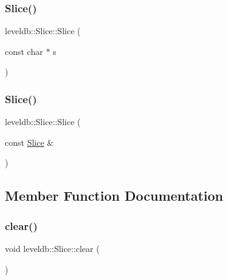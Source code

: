 \mbox{\label{classleveldb_1_1_slice_a429c530560405fe1a7cd745f7afecf5a}} 
\subsubsection{\texorpdfstring{Slice()}{Slice()}\hspace{0.1cm}{\footnotesize\ttfamily [4/5]}}
{\footnotesize\ttfamily leveldb\+::\+Slice\+::\+Slice (\begin{DoxyParamCaption}\item[{const char $\ast$}]{s }\end{DoxyParamCaption})\hspace{0.3cm}{\ttfamily [inline]}}

\mbox{\label{classleveldb_1_1_slice_a53cdde237c653292d361e92bc0f25229}} 
\subsubsection{\texorpdfstring{Slice()}{Slice()}\hspace{0.1cm}{\footnotesize\ttfamily [5/5]}}
{\footnotesize\ttfamily leveldb\+::\+Slice\+::\+Slice (\begin{DoxyParamCaption}\item[{const \mbox{\hyperlink{classleveldb_1_1_slice}{Slice}} \&}]{ }\end{DoxyParamCaption})\hspace{0.3cm}{\ttfamily [default]}}



\subsection{Member Function Documentation}
\mbox{\label{classleveldb_1_1_slice_ab9b6e340e8a483a5cf713f6be17709e3}} 
\subsubsection{\texorpdfstring{clear()}{clear()}}
{\footnotesize\ttfamily void leveldb\+::\+Slice\+::clear (\begin{DoxyParamCaption}{ }\end{DoxyParamCaption})\hspace{0.3cm}{\ttfamily [inline]}}


